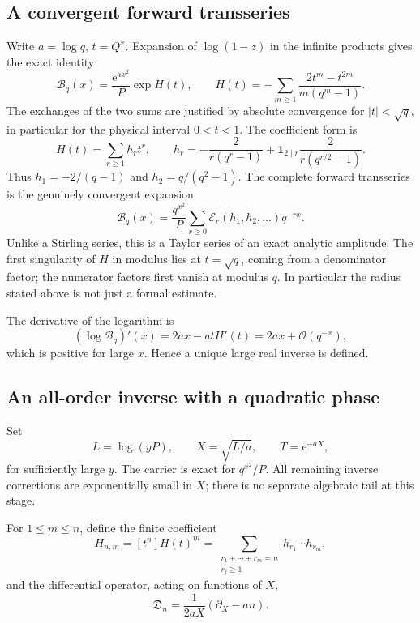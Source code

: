 \documentclass[11pt,a4paper]{article}
\theoremstyle{definition}
\theoremstyle{remark}
\newcommand{\ee}{\mathrm e}
\newcommand{\OO}{\mathcal O}
\newcommand{\coef}[1]{\left[#1\right]}
\newcommand{\ExpC}{\mathcal E}
\numberwithin{equation}{section}
\begin{document}
\subsection{A convergent forward transseries}
Write $a=\log q$, $t=Q^x$. Expansion of $\log(1-z)$ in the infinite products gives the exact identity
\begin{equation}
 \mathcal B_q(x)=\frac{\ee^{ax^2}}P\exp H(t),\qquad
 H(t)=-\sum_{m\ge1}\frac{2t^m-t^{2m}}{m(q^m-1)}.
 \label{eq:qbinH}
\end{equation}
The exchanges of the two sums are justified by absolute convergence for $|t|<\sqrt q$, in particular for the physical interval $0<t<1$. The coefficient form is
\begin{equation}
 H(t)=\sum_{r\ge1}h_rt^r,\qquad
 h_r=-\frac2{r(q^r-1)}+
 \mathbf1_{2\mid r}\frac2{r(q^{r/2}-1)}.
 \label{eq:qbinh}
\end{equation}
Thus $h_1=-2/(q-1)$ and $h_2=q/(q^2-1)$. The complete forward transseries is the genuinely convergent expansion
\begin{equation}
 \mathcal B_q(x)=\frac{q^{x^2}}P
 \sum_{r\ge0}\ExpC_r(h_1,h_2,\ldots)q^{-rx}.
 \label{eq:qbinforward}
\end{equation}
Unlike a Stirling series, this is a Taylor series of an exact analytic amplitude. The first singularity of $H$ in modulus lies at $t=\sqrt q$, coming from a denominator factor; the numerator factors first vanish at modulus $q$. In particular the radius stated above is not just a formal estimate.

The derivative of the logarithm is
\[
 (\log\mathcal B_q)'(x)=2ax-atH'(t)=2ax+\OO(q^{-x}),
\]
which is positive for large $x$. Hence a unique large real inverse is defined.

\subsection{An all-order inverse with a quadratic phase}
Set
\begin{equation}
 L=\log(yP),\qquad X=\sqrt{L/a},\qquad T=\ee^{-aX},
 \label{eq:qbincore}
\end{equation}
for sufficiently large $y$. The carrier is exact for $q^{x^2}/P$. All remaining inverse corrections are exponentially small in $X$; there is no separate algebraic tail at this stage.

For $1\le m\le n$, define the finite coefficient
\begin{equation}
 H_{n,m}=\coef{t^n}H(t)^m
 =\sum_{\substack{r_1+\cdots+r_m=n\\r_j\ge1}}h_{r_1}\cdots h_{r_m},
 \label{eq:qHnm}
\end{equation}
and the differential operator, acting on functions of $X$,
\begin{equation}
 \mathfrak D_n=\frac1{2aX}(\partial_X-an).
 \label{eq:qoperator}
\end{equation}
\end{document}
